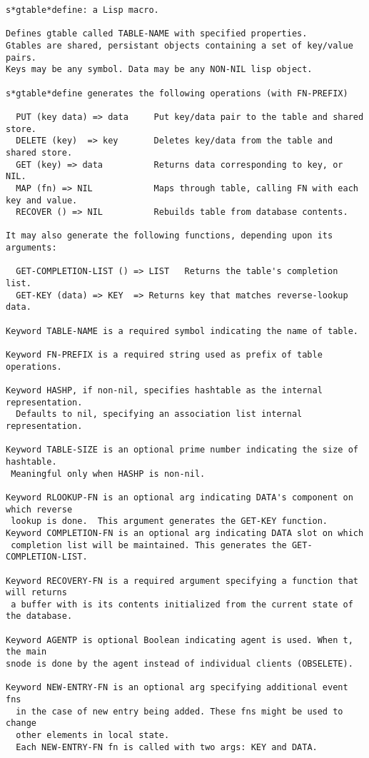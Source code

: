 \small\begin{verbatim}
s*gtable*define: a Lisp macro.

Defines gtable called TABLE-NAME with specified properties.
Gtables are shared, persistant objects containing a set of key/value pairs.
Keys may be any symbol. Data may be any NON-NIL lisp object.

s*gtable*define generates the following operations (with FN-PREFIX)

  PUT (key data) => data     Put key/data pair to the table and shared store.
  DELETE (key)  => key       Deletes key/data from the table and shared store.
  GET (key) => data          Returns data corresponding to key, or NIL.
  MAP (fn) => NIL            Maps through table, calling FN with each key and value.
  RECOVER () => NIL          Rebuilds table from database contents.

It may also generate the following functions, depending upon its arguments:

  GET-COMPLETION-LIST () => LIST   Returns the table's completion list.
  GET-KEY (data) => KEY  => Returns key that matches reverse-lookup data.

Keyword TABLE-NAME is a required symbol indicating the name of table.

Keyword FN-PREFIX is a required string used as prefix of table operations.

Keyword HASHP, if non-nil, specifies hashtable as the internal representation.
  Defaults to nil, specifying an association list internal representation.

Keyword TABLE-SIZE is an optional prime number indicating the size of hashtable. 
 Meaningful only when HASHP is non-nil.

Keyword RLOOKUP-FN is an optional arg indicating DATA's component on which reverse
 lookup is done.  This argument generates the GET-KEY function.
Keyword COMPLETION-FN is an optional arg indicating DATA slot on which 
 completion list will be maintained. This generates the GET-COMPLETION-LIST.

Keyword RECOVERY-FN is a required argument specifying a function that will returns
 a buffer with is its contents initialized from the current state of the database.

Keyword AGENTP is optional Boolean indicating agent is used. When t, the main 
snode is done by the agent instead of individual clients (OBSELETE).

Keyword NEW-ENTRY-FN is an optional arg specifying additional event fns
  in the case of new entry being added. These fns might be used to change 
  other elements in local state. 
  Each NEW-ENTRY-FN fn is called with two args: KEY and DATA.


\end{verbatim}
